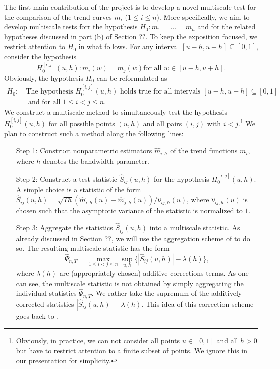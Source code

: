 \documentclass[a4paper,12pt]{article}
\begin{document}
\noindent The first main contribution of the project is to develop a novel multiscale test for the comparison of the trend curves $m_i$ ($1 \le i \le n$). More specifically, we aim to develop multiscale tests forr the hypothesis $H_0: m_1 = \ldots = m_n$ and for the related hypotheses discussed in part (b) of Section ??. To keep the exposition focused, we restrict attention to $H_0$ in what follows. For any interval $[u-h,u+h] \subseteq [0,1]$, consider the hypothesis
\[ H_0^{[i,j]}(u,h): m_i(w) = m_j(w) \text{for all } w \in [u-h,u+h]. \] 
Obviously, the hypothesis $H_0$ can be reformulated as
\begin{align*}
H_0: \ & \text{The hypothesis } H_0^{[i,j]}(u,h) \text{ holds true for all intervals } [u-h,u+h] \subseteq [0,1] \\ & \text{ and for all } 1 \le i < j \le n. 
\end{align*} 
We construct a multiscale method to simultaneously test the hypothesis $H_0^{[i,j]}(u,h)$ for all possible points $(u,h)$ and all pairs $(i,j)$ with $i < j$.\footnote{Obviously, in practice, we can not consider all points $u \in [0,1]$ and all $h > 0$ but have to restrict attention to a finite subset of points. We ignore this in our presentation for simplicity.} We plan to construct such a method along the following lines: 
\begin{itemize}[leftmargin=1.5cm]
\item[Step 1:] Construct nonparametric estimators $\hat{m}_{i,h}$ of the trend functions $m_i$, where $h$ denotes the bandwidth parameter.   
\item[Step 2:] Construct a test statistic $\hat{S}_{ij}(u,h)$ for the hypothesis $H_0^{[i,j]}(u,h)$. A simple choice is a statistic of the form $\hat{S}_{ij}(u,h) = \sqrt{Th} (\hat{m}_{i,h}(u) - \hat{m}_{j,h}(u)) / \hat{\nu}_{ij,h}(u)$, where $\hat{\nu}_{ij,h}(u)$ is chosen such that the asymptotic variance of the statistic is normalized to $1$. 
\item[Step 3:] Aggregate the statistics $\hat{S}_{ij}(u,h)$ into a multiscale statistic. As already discussed in Section ??, we will use the aggregation scheme of \cite{DuembgenSpokoiny2001} to do so. The resulting multiscale statistic has the form 
\[ \hat{\Psi}_{n,T} = \max_{1 \le i < j \le n} \sup_{u,h} \big\{ |\hat{S}_{ij}(u,h)| - \lambda(h) \big\},  \]
where $\lambda(h)$ are (appropriately chosen) additive corrections terms. As one can see, the multiscale statistic is not obtained by simply aggregating the individual statistics $\hat{\Psi}_{n,T}$. We rather take the supremum of the additively corrected statistics $|\hat{S}_{ij}(u,h)| - \lambda(h)$. This idea of this correction scheme goes back to \cite{DuembgenSpokoiny2001}. 
 \end{itemize}
\end{document}
